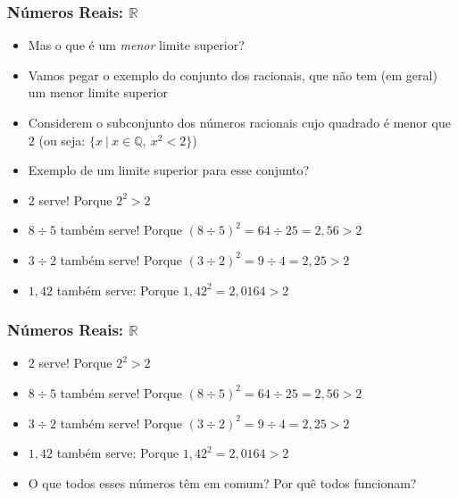 \documentclass[usenames,dvipsnames,svgnames]{beamer}
\begin{document}
\begin{frame}
	
	\frametitle{Números Reais: $\mathbb{R}$}

	\begin{itemize}
		\item Mas o que é um \emph{menor} limite superior?
		\item Vamos pegar o exemplo do conjunto dos racionais, que não tem (em geral) um menor limite superior
		\item Considerem o subconjunto dos números racionais cujo quadrado é menor que $2$ (ou seja: $\{x ~|~ x \in \mathbb{Q},~ x^2 < 2\}$)
		\item Exemplo de um limite superior para esse conjunto?
		\item $2$ serve! Porque $2^2 > 2$
		\item $8 \div 5$ também serve! Porque $(8 \div 5)^2 = 64 \div 25 = 2,56 > 2$
		\item $3 \div 2$ também serve! Porque $(3 \div 2)^2 = 9 \div 4 = 2,25 > 2$
		\item $1,42$ também serve: Porque $1,42^2 = 2,0164 > 2$
	\end{itemize}

\end{frame}

\begin{frame}
	
	\frametitle{Números Reais: $\mathbb{R}$}

	\begin{itemize}
		\item $2$ serve! Porque $2^2 > 2$
		\item $8 \div 5$ também serve! Porque $(8 \div 5)^2 = 64 \div 25 = 2,56 > 2$
		\item $3 \div 2$ também serve! Porque $(3 \div 2)^2 = 9 \div 4 = 2,25 > 2$
		\item $1,42$ também serve: Porque $1,42^2 = 2,0164 > 2$
		\item O que todos esses números têm em comum? Por quê todos funcionam?
	\end{itemize}

\end{frame}
\end{document}

